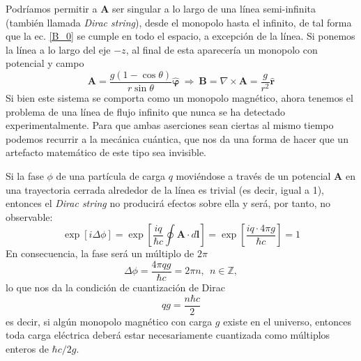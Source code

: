 \documentclass[twocolumn]{article}
\numberwithin{equation}{section}
\newcommand{\0}{\textcolor{gray}{0}}
\newcommand{\ro}{\nabla\times}
\newcommand{\rv}{\mathbf{r}}
\newcommand{\rhat}{\hat{\rv}}
\newcommand{\phat}{\hat{\mathbf{\varphi}}}
\newcommand{\n}[1]{\mathbf{#1}}
\begin{document}
%	
	Podríamos permitir a $\n{A}$ ser singular a lo largo de una línea semi-infinita (también llamada \textit{Dirac string}), desde el monopolo hasta el infinito, de tal forma que la ec. \ref{B_0} se cumple en todo el espacio, a excepción de la línea. Si ponemos la línea a lo largo del eje $-z$, al final de esta aparecería un monopolo con potencial y campo
	\begin{equation}
		\n{A} = \frac{g (1 - \cos\theta)}{r \sin\theta}\phat ~\Rightarrow~ \n{B} = \ro\n{A} = \frac{g}{r^2}\rhat
	\end{equation}
	Si bien este sistema se comporta como un monopolo magnético, ahora tenemos el problema de una línea de flujo infinito que nunca se ha detectado experimentalmente. Para que ambas aserciones sean ciertas al mismo tiempo podemos recurrir a la mecánica cuántica, que nos da una forma de hacer que un artefacto matemático de este tipo sea invisible.
	
	Si la fase $\phi$ de una partícula de carga $q$ moviéndose a través de un potencial $\n{A}$ en una trayectoria cerrada alrededor de la línea es trivial (es decir, igual a 1), entonces  el \textit{Dirac string} no producirá efectos sobre ella y será, por tanto, no observable:
	\begin{equation}
		\exp\left[i \Delta \phi \right] = \exp\left[\frac{i q}{\hbar c} \oint \n{A} \cdot d\n{l}\right] = \exp\left[\frac{i q \cdot 4\pi g}{\hbar c} \right] = 1
	\end{equation}
	En consecuencia, la fase será un múltiplo de $2\pi$
	\begin{equation}
		\Delta \phi = \frac{ 4\pi q g}{\hbar c} = 2\pi n, ~~ n \in \mathbb{Z}, \label{2pin}
	\end{equation}
	lo que nos da la condición de cuantización de Dirac
	\begin{equation}
		qg = \frac{n \hbar c}{2}
	\end{equation}
	es decir, si algún monopolo magnético con carga $g$ existe en el universo, entonces toda carga eléctrica deberá estar necesariamente cuantizada como múltiplos enteros de $\hbar c/2 g$.
	
\end{document}
